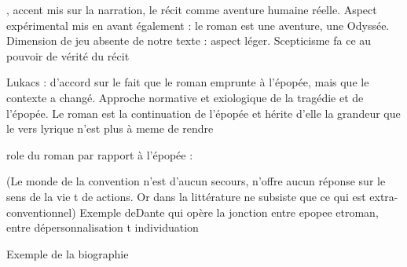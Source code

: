 \documentclass[a4paper,10pt]{article}
\begin{document}
\cite{Blanchot1959}, accent mis sur la narration, le récit comme aventure humaine réelle. Aspect expérimental mis en avant également : le roman est une aventure, une Odyssée. Dimension de jeu absente de notre texte : aspect léger. Scepticisme fa ce au pouvoir de vérité du récit




Lukacs : d'accord sur le fait que le roman emprunte à l'épopée, mais que le contexte a changé.
Approche normative et exiologique de la tragédie et de l'épopée. Le roman est la continuation de l'épopée et hérite d'elle la grandeur que le vers lyrique n'est plus à meme de rendre

role du roman par rapport à l'épopée :

(Le monde de la convention n'est d'aucun secours, n'offre aucun réponse sur le sens de la vie t de actions. Or dans la littérature ne subsiste que ce qui est extra-conventionnel)
Exemple deDante qui opère la jonction entre epopee etroman, entre dépersonnalisation t individuation

Exemple de la biographie
\medskip



\end{document}
